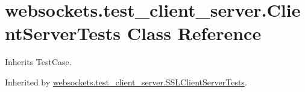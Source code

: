 \hypertarget{classwebsockets_1_1test__client__server_1_1_client_server_tests}{}\section{websockets.\+test\+\_\+client\+\_\+server.\+Client\+Server\+Tests Class Reference}
\label{classwebsockets_1_1test__client__server_1_1_client_server_tests}


Inherits Test\+Case.



Inherited by \hyperlink{classwebsockets_1_1test__client__server_1_1_s_s_l_client_server_tests}{websockets.\+test\+\_\+client\+\_\+server.\+S\+S\+L\+Client\+Server\+Tests}.


